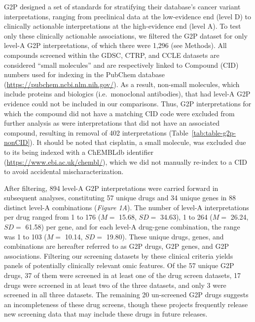 \documentclass[man]{apa6}
\begin{document}
G2P designed a set of standards for stratifying their database's cancer
variant interpretations, ranging from preclinical data at the
low-evidence end (level D) to clinically actionable interpretations at
the high-evidence end (level A). To test only these clinically
actionable associations, we filtered the G2P dataset for only level-A
G2P interpretations, of which there were 1,296 (see Methods). All
compounds screened within the GDSC, CTRP, and CCLE datasets are
considered \enquote{small molecules} and are respectively linked to
Compound (CID) numbers used for indexing in the PubChem database
(\url{https://pubchem.ncbi.nlm.nih.gov/}). As a result, non-small
molecules, which include proteins and biologics (i.e.~monoclonal
antibodies), that had level-A G2P evidence could not be included in our
comparisons. Thus, G2P interpretations for which the compound did not
have a matching CID code were excluded from further analysis as were
interpretations that did not have an associated compound, resulting in
removal of 402 interpretations (Table~\ref{tab:table-g2p-nonCID}). It
should be noted that cisplatin, a small molecule, was excluded due to
its being indexed with a ChEMBLdb identifier
(\url{https://www.ebi.ac.uk/chembl/}), which we did not manually
re-index to a CID to avoid accidental mischaracterization.

After filtering, 894 level-A G2P interpretations were carried forward in
subsequent analyses, constituting 57 unique drugs and 34 unique genes in
88 distinct level-A combinations (\emph{Figure 1A}). The number of
level-A interpretations per drug ranged from 1 to 176 (\(M =\) 15.68,
\(SD =\) 34.63), 1 to 264 (\(M =\) 26.24, \(SD =\) 61.58) per gene, and
for each level-A drug-gene combination, the range was 1 to 103 (\(M =\)
10.14, \(SD =\) 19.80). These unique drugs, genes, and combinations are
hereafter referred to as G2P drugs, G2P genes, and G2P associations.
Filtering our screening datasets by these clinical criteria yields
panels of potentially clinically relevant omic features. Of the 57
unique G2P drugs, 37 of them were screened in at least one of the drug
screen datasets, 17 drugs were screened in at least two of the three
datasets, and only 3 were screened in all three datasets. The remaining
20 un-screened G2P drugs suggests an incompleteness of these drug
screens, though these projects frequently release new screening data
that may include these drugs in future releases.
\end{document}
